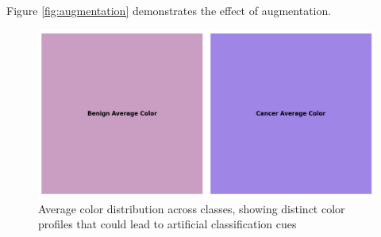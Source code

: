 \documentclass[10pt,twocolumn]{article}
\begin{document}
Figure \ref{fig:augmentation} demonstrates the effect of augmentation.

\begin{figure}[h]
\centering
\includegraphics[width=0.8\columnwidth]{imgs/class_avg_colors_horz.png}
\caption{Average color distribution across classes, showing distinct color profiles that could lead to artificial classification cues}
\label{fig:color_distribution}
\end{figure}
\end{document}
